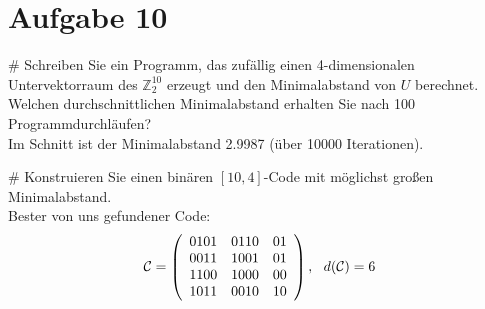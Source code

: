 \section*{Aufgabe 10}
\begin{myList}
#
Schreiben Sie ein Programm, das zufällig einen 4-dimensionalen Untervektorraum des $\mathbb{Z}^10_2$ erzeugt und den Minimalabstand von $U$ berechnet.
Welchen durchschnittlichen Minimalabstand erhalten Sie nach 100 Programmdurchläufen?\\
Im Schnitt ist der Minimalabstand 2.9987 (über 10000 Iterationen).


#
Konstruieren Sie einen binären $[10,4]$-Code mit möglichst großen Minimalabstand.\\
Bester von uns gefundener Code:\\
\begin{align*}
\mathcal{C} = \left( \begin{array}{ccc}
0101&0110&01\\
0011&1001&01\\
1100&1000&00\\
1011&0010&10
\end{array} \right),~~d(\mathcal{C})=6
\end{align*}

\end{myList}





